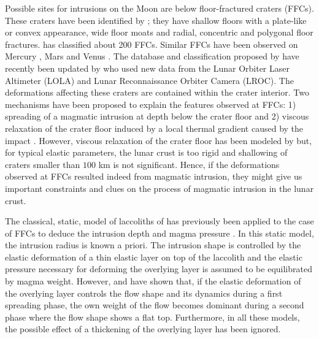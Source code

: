 Possible sites  for intrusions on  the Moon are  below floor-fractured
craters   (FFCs).     These   craters   have   been    identified   by
\citet{Schultz:1976kt}; they have shallow  floors with a plate-like or
convex  appearance,  wide  floor  moats  and  radial,  concentric  and
polygonal  floor  fractures.   \citet{Schultz:1976kt}  has  classified
about  200  FFCs.    Similar  FFCs  have  been   observed  on  Mercury
\citep{Head:2008cm},                                              Mars
\citep{Schultz:1978tw,Schultz:1979iw,Sato:2010ex}       and      Venus
\citep{Wichman:1995ju}.  The  database and classification  proposed by
\citet{Schultz:1976kt}     have    recently     been    updated     by
\citet{Jozwiak:2012dq} who used new data  from the Lunar Orbiter Laser
Altimeter (LOLA) and Lunar  Reconnaissance Orbiter Camera (LROC).  The
deformations affecting  these craters are contained  within the crater
interior.  Two mechanisms  have been proposed to  explain the features
observed at FFCs: 1) spreading of  a magmatic intrusion at depth below
the                            crater                            floor
\citep{Schultz:1976kt,Wichman:1993hk,Wichman:1995ic,Wichman:1996bj,Jozwiak:2012dq}
and  2) viscous  relaxation of  the crater  floor induced  by a  local
thermal gradient  caused by the impact  \citep{Hall:1981kl}.  However,
viscous  relaxation   of  the  crater   floor  has  been   modeled  by
\citet{Dombard:2001gs} but, for typical  elastic parameters, the lunar
crust is too rigid and shallowing  of craters smaller than $100$ km is
not significant.  Hence, if the deformations observed at FFCs resulted
indeed  from   magmatic  intrusion,  they  might   give  us  important
constraints  and clues  on the  process of  magmatic intrusion  in the
lunar crust.
	
The classical,  static, model of laccoliths  of \citet{Pollard:1973ho}
has  previously  been applied  to  the  case  of  FFCs to  deduce  the
intrusion          depth          and          magma          pressure
\citep{Wichman:1993hk,Wichman:1996bj,Jozwiak:2012dq}.  In  this static
model, the intrusion radius is known  a priori. The intrusion shape is
controlled by the  elastic deformation of a thin elastic  layer on top
of the laccolith and the  elastic pressure necessary for deforming the
overlying  layer  is  assumed  to be  equilibrated  by  magma  weight.
However, \citet{Michaut:2011kg}  and \citet{Bunger:2011cb}  have shown
that, if the  elastic deformation of the overlying  layer controls the
flow shape  and its dynamics during  a first spreading phase,  the own
weight of  the flow becomes dominant  during a second phase  where the
flow shape  shows a flat top.   Furthermore, in all these  models, the
possible  effect of  a  thickening  of the  overlying  layer has  been
ignored.
	

